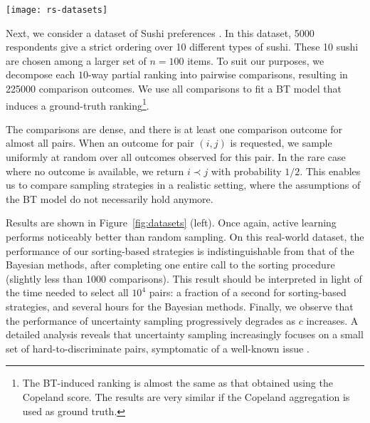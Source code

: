 \begin{figure*}[t]
\centering
\texttt{[image: rs-datasets]}
\caption{
Results on two real-world datasets.
Every experiment is repeated \num{10} times, and we report the mean and the standard deviation.
Left: on the sushi dataset, sorting-based and Bayesian AL strategies have near-identical performance starting from $c \approx \num{1000}$.
Right: on the GIFGIF dataset, most AL strategies are computationally too expensive---except for sorting-based methods.
}
\label{fig:datasets}
\end{figure*}

Next, we consider a dataset of Sushi preferences \citep{kamishima2009efficient}.
In this dataset, \num{5000} respondents give a strict ordering over \num{10} different types of sushi.
These \num{10} sushi are chosen among a larger set of $n = \num{100}$ items.
To suit our purposes, we decompose each $10$-way partial ranking into pairwise comparisons, resulting in \num{225000} comparison outcomes.
We use all comparisons to fit a BT model that induces a ground-truth ranking\footnote{
The BT-induced ranking is almost the same as that obtained using the Copeland score.
The results are very similar if the Copeland aggregation is used as ground truth.}.

The comparisons are dense, and there is at least one comparison outcome for almost all pairs.
When an outcome for pair $(i,j)$ is requested, we sample uniformly at random over all outcomes observed for this pair.
In the rare case where no outcome is available, we return $i \prec j$ with probability $1/2$.
This enables us to compare sampling strategies in a realistic setting, where the assumptions of the BT model do not necessarily hold anymore.

Results are shown in Figure~\ref{fig:datasets} (left).
Once again, active learning performs noticeably better than random sampling.
On this real-world dataset, the performance of our sorting-based strategies is indistinguishable from that of the Bayesian methods, after completing one entire call to the sorting procedure (slightly less than \num{1000} comparisons).
This result should be interpreted in light of the time needed to select all $10^4$ pairs: a fraction of a second for sorting-based strategies, and several hours for the Bayesian methods.
Finally, we observe that the performance of uncertainty sampling progressively degrades as $c$ increases.
A detailed analysis reveals that uncertainty sampling increasingly focuses on a small set of hard-to-discriminate pairs, symptomatic of a well-known issue \citep{settles2012active}.


